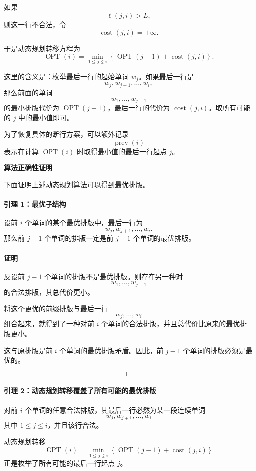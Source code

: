 \documentclass[12pt,a4paper]{article}
\begin{document}
\begin{answerbox}
如果
\[
\ell(j,i)>L,
\]
则这一行不合法，令
\[
\operatorname{cost}(j,i)=+\infty.
\]

于是动态规划转移方程为
\[
\operatorname{OPT}(i)
=
\min_{1\le j\le i}
\left\{
\operatorname{OPT}(j-1)+\operatorname{cost}(j,i)
\right\}.
\]

这里的含义是：枚举最后一行的起始单词 $w_j$。如果最后一行是
\[
w_j,w_{j+1},\ldots,w_i,
\]
那么前面的单词
\[
w_1,\ldots,w_{j-1}
\]
的最小排版代价为 $\operatorname{OPT}(j-1)$，最后一行的代价为 $\operatorname{cost}(j,i)$。取所有可能的 $j$ 中的最小值即可。

为了恢复具体的断行方案，可以额外记录
\[
\operatorname{prev}(i)
\]
表示在计算 $\operatorname{OPT}(i)$ 时取得最小值的最后一行起点 $j$。

\textbf{算法正确性证明}

下面证明上述动态规划算法可以得到最优排版。

\paragraph{引理 1：最优子结构}

设前 $i$ 个单词的某个最优排版中，最后一行为
\[
w_j,w_{j+1},\ldots,w_i.
\]
那么前 $j-1$ 个单词的排版一定是前 $j-1$ 个单词的最优排版。

\paragraph{证明}

反设前 $j-1$ 个单词的排版不是最优排版。则存在另一种对
\[
w_1,\ldots,w_{j-1}
\]
的合法排版，其总代价更小。

将这个更优的前缀排版与最后一行
\[
w_j,\ldots,w_i
\]
组合起来，就得到了一种对前 $i$ 个单词的合法排版，并且总代价比原来的最优排版更小。

这与原排版是前 $i$ 个单词的最优排版矛盾。因此，前 $j-1$ 个单词的排版必须是最优的。

\[
\Box
\]

\paragraph{引理 2：动态规划转移覆盖了所有可能的最优排版}

对前 $i$ 个单词的任意合法排版，其最后一行必然为某一段连续单词
\[
w_j,w_{j+1},\ldots,w_i
\]
其中 $1\le j\le i$，并且该行合法。

动态规划转移
\[
\operatorname{OPT}(i)
=
\min_{1\le j\le i}
\left\{
\operatorname{OPT}(j-1)+\operatorname{cost}(j,i)
\right\}
\]
正是枚举了所有可能的最后一行起点 $j$。


\end{answerbox}
\end{document}
